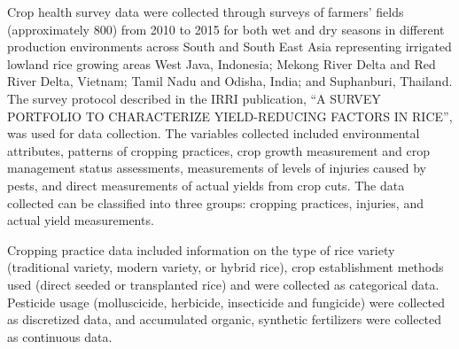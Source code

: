 Crop health survey data were collected through surveys of farmers' fields (approximately 800) from 2010 to 2015 for both wet and dry seasons in different production environments across South and South East Asia representing irrigated lowland rice growing areas West Java, Indonesia; Mekong River Delta and Red River Delta, Vietnam; Tamil Nadu and Odisha, India; and Suphanburi, Thailand. The survey protocol described in the IRRI publication, ``A SURVEY PORTFOLIO TO CHARACTERIZE YIELD-REDUCING FACTORS IN RICE'', \citep{Savarysurvey2009} was used for data collection. The variables collected included environmental attributes, patterns of cropping practices, crop growth measurement and crop management status assessments, measurements of levels of injuries caused by pests, and direct measurements of actual yields from crop cuts. The data collected can be classified into three groups: cropping practices, injuries, and actual yield measurements.

Cropping practice data included information on the type of rice variety (traditional variety, modern variety, or hybrid rice), crop establishment methods used (direct seeded or transplanted rice) and were collected as categorical data. Pesticide usage (molluscicide, herbicide, insecticide and fungicide) were collected as discretized data, and accumulated organic, synthetic fertilizers were collected as continuous data.

